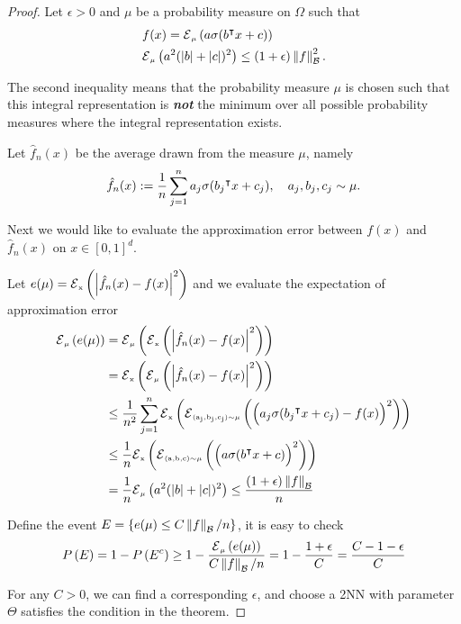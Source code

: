 \begin{proof}

Let $\epsilon >0$ and $\mu$ be a probability measure on $\Omega$ such that
\begin{align}
    &f(x) 
    = \ERWi{\mu}{a \sigma(b\tr x + c)} \\
    &\ERWi{\mu}{a^2 (\abs{b} + \abs{c})^2} 
    \leq (1+\epsilon) \norm{f}_{\mcal{B}}^2.
\end{align}

The second inequality means that the probability measure $\mu$ is chosen such
that this integral representation is \textbf{\textit{not}} the minimum over all
possible probability measures where the integral representation exists.

Let $\hat{f}_n(x)$ be the average drawn from the measure $\mu$, namely
\begin{equation}
    \hat{f}_n(x) := \frac{1}{n} \sum_{j=1}^n 
    a_j \sigma(b_j{}^{\intercal} x + c_j), \quad a_j, b_j, c_j \sim \mu.
\end{equation}

Next we would like to evaluate the approximation error between $f(x)$ and
$\hat{f}_n(x)$ on $x \in [0,1]^d$.

Let $e(\mu) = \ERWi{x}{\abs{\hat{f}_n(x) - f(x)}^2}$ and we evaluate the
expectation of approximation error
\begin{align}
    \ERWi{\mu}{e(\mu)} 
    &=
    \ERWi{\mu}{
        \ERWi{x}{
            \abs{\hat{f}_n(x) - f(x)}^2
        }
    } \\
    &= \ERWi{x}{
        \ERWi{\mu}{
            \abs{\hat{f}_n(x) - f(x)}^2
        }
    } \\
    &\leq \frac{1}{n^2} \sum_{j=1}^n \ERWi{x}{
        \ERWi{(a_j,b_j,c_j)\sim\mu}{ 
            \Big(a_j \sigma(b_j\tr x + c_j) - f(x)\Big)^2    
        }
    } \\
    &\leq \frac{1}{n} \ERWi{x}{
        \ERWi{(a,b,c)\sim\mu}{ 
            \Big(a \sigma(b\tr x + c)\Big)^2
        }
    } \\
    &= \frac{1}{n} \ERWi{\mu}{a^2 (\abs{b} + \abs{c})^2} 
    \leq \frac{(1+\epsilon)\norm{f}_{\mcal{B}}}{n}
\end{align}

Define the event $E = \{e(\mu) \leq C \left\| f \right\|_{\mathcal{B}}/n\}$, it is easy to
check
\begin{equation}
    \PR{E} = 1 - \PR{E^c} \geq 
    1 - \frac{\ERWi{\mu}{e(\mu)}}{C \norm{f}_{\mcal{B}}/n} =
    1 - \frac{1+\epsilon}{C} =
    \frac{C - 1 - \epsilon}{C}
\end{equation}

For any $C > 0$, we can find a corresponding $\epsilon$, and choose a 2NN with
parameter $\Theta$ satisfies the condition in the theorem.

\end{proof}



